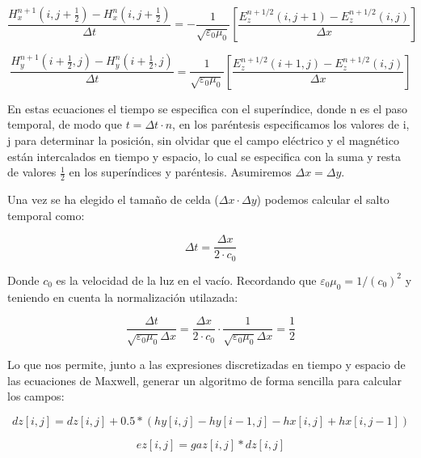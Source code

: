 \documentclass[11pt,a4paper,twoside,pdf]{article}
\numberwithin{equation}{section}
\begin{document}
\begin{equation}
\frac{H^{n+1}_{x}(i,j+\frac{1}{2})-H^{n}_{x}(i,j+\frac{1}{2})}{\Delta t}=-\frac{1}{\sqrt{\varepsilon_{0}\mu_{0}}}\left[\frac{E^{n+1/2}_{z}(i,j+1)-E^{n+1/2}_{z}(i,j)}{\Delta x}\right] 
\end{equation}

\begin{equation} 
\frac{H^{n+1}_{y}(i+\frac{1}{2},j)-H^{n}_{y}(i+\frac{1}{2},j)}{\Delta t}=\frac{1}{\sqrt{\varepsilon_{0}\mu_{0}}}\left[\frac{E^{n+1/2}_{z}(i+1,j)-E^{n+1/2}_{z}(i,j)}{\Delta x}\right] 
\end{equation}

En estas ecuaciones el tiempo se especifica con el superíndice, donde n es el paso temporal, de modo que $t=\Delta t\cdot n$, en los paréntesis especificamos los valores de i, j para determinar la posición, sin olvidar que el campo eléctrico y el magnético están intercalados en tiempo y espacio, lo cual se especifica con la suma y resta de valores $\frac{1}{2}$ en los superíndices y paréntesis. 
Asumiremos $\Delta x = \Delta y$.

Una vez se ha elegido el tamaño de celda ($\Delta x \cdot \Delta y$) podemos calcular el salto temporal como:

\begin{equation}
\Delta t=\frac{\Delta x}{2 \cdot c_{0}}
\end{equation}

Donde $c_{0}$ es la velocidad de la luz en el vacío. Recordando que $\varepsilon_{0} \mu_{0}=1/(c_{0})^2$ y teniendo en cuenta la normalización utilazada:

\begin{equation}
    \frac{\Delta t}{\sqrt{\varepsilon_{0} \mu_{0}} \Delta x}=\frac{\Delta x}{2 \cdot c_{0}}\cdot 
     \frac{1}{\sqrt{\varepsilon_{0} \mu_{0}} \Delta x}=\frac{1}{2}
\end{equation}

Lo que nos permite, junto a las expresiones discretizadas en tiempo y espacio de las ecuaciones de Maxwell, generar un algoritmo de forma sencilla para calcular los campos:

\begin{equation}
dz[i,j]=dz[i,j] + 0.5*(hy[i,j]-hy[i-1,j]-hx[i,j]+hx[i,j-1])
\end{equation}

\begin{equation}
    ez[i,j]=gaz[i,j]*dz[i,j]
\end{equation}
\end{document}
